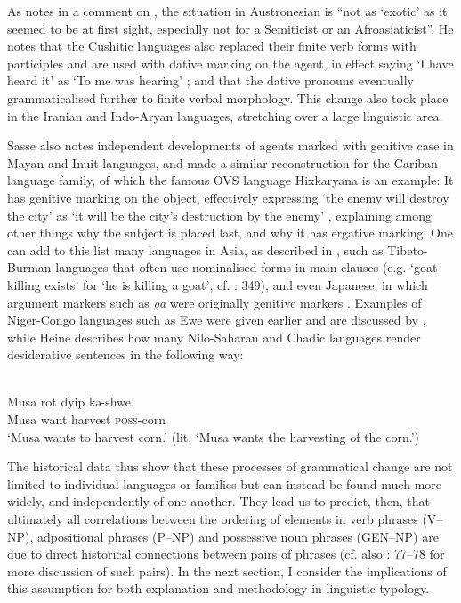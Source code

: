 \documentclass[output=paper]{langsci/langscibook}
\begin{document}
As \citet[167]{Sasse2009} notes in a comment on \citet{Kaufman2009}, the situation in Austronesian is “not as ‘exotic’ as it seemed to be at first sight, especially not for a Semiticist or an Afroasiaticist”. He notes that the Cushitic languages also replaced their finite verb forms with participles and are used with dative marking on the agent, in effect saying ‘I have heard it’ as ‘To me was hearing’ \citep[174]{Sasse2009}; and that the dative pronouns eventually grammaticalised further to finite verbal morphology. This change also took place in the Iranian and Indo-Aryan languages, stretching over a large linguistic area. 

Sasse also notes independent developments of agents marked with genitive case in Mayan and Inuit languages, and \citet{Gildea1997} made a similar reconstruction for the Cariban language family, of which the famous OVS language Hixkaryana is an example: It has genitive marking on the object, effectively expressing ‘the enemy will destroy the city’ as ‘it will be the city’s destruction by the enemy’ \citep[153]{Gildea1997}, explaining among other things why the subject is placed last, and why it has ergative marking. One can add to this list many languages in Asia, as described in \citet{YapEtAl2011}, such as Tibeto-Burman languages that often use nominalised forms in main clauses (e.g. ‘goat-killing exists’ for ‘he is killing a goat’, cf. \citealt{DeLancey2011}: 349), and even Japanese, in which argument markers such as \textit{ga} were originally genitive markers \citep[461]{Shinzato2011}. Examples of Niger-Congo languages such as Ewe were given earlier and are discussed by \citet{Claudi1994}, while Heine describes how many Nilo-Saharan and Chadic languages render desiderative sentences in the following way:

\ea\label{ex:key:} 
\\
\gll Musa   rot   dyip   kə-shwe.\\
     Musa   want   harvest   \textsc{poss-}corn\\
\glt ‘Musa wants to harvest corn.’ (lit. ‘Musa wants the harvesting of the corn.’)
\z

The historical data thus show that these processes of grammatical change are not limited to individual languages or families but can instead be found much more widely, and independently of one another. They lead us to predict, then, that ultimately all correlations between the ordering of elements in verb phrases (V–NP), adpositional phrases (P–NP) and possessive noun phrases (GEN–NP) are due to direct historical connections between pairs of phrases (cf. also \citealt{Croft2003}: 77–78 for more discussion of such pairs). In the next section, I consider the implications of this assumption for both explanation and methodology in linguistic typology.
\end{document}
